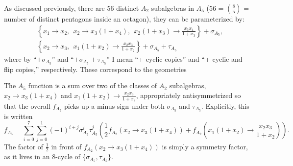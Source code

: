 \documentclass[11pt]{article}
\def\drawOctagon{
\coordinate (P1) at (45:1);
\coordinate (P2) at (90:1);
\coordinate (P3) at (135:1);
\coordinate (P4) at (180:1);
\coordinate (P5) at (225:1);
\coordinate (P6) at (270:1);
\coordinate (P7) at (315:1);
\coordinate (P8) at (359:1);
\draw (P1) -- (P2) -- (P3) -- (P4) -- (P5) -- (P6) -- (P7) -- (P8) -- cycle;
}
\begin{document}
As discussed previously, there are 56 distinct $A_2$ subalgebras in $A_5$ (56 = $\genfrac(){0pt}{1}{8}{5}$ = number of distinct pentagons inside an octagon), they can be parameterized by:
\begin{equation}
\begin{split}
	&\left\{x_1\to x_2,~~
	x_2\to x_3\left(1+x_4\right),~~
	x_2\left(1+x_3\right)\to \frac{x_3 x_4}{1+x_3}\right\} + \sigma_{A_5},\\
	&\left\{x_2\to x_3,~~x_1 \left(1+x_2\right)\to \frac{x_2x_3}{1+x_2}\right\} + \sigma_{A_5} + \tau_{A_5} 
   \end{split}
\end{equation}
where by ``$+\sigma_{A_5}$'' and ``$+\sigma_{A_5}+\tau_{A_5}$'' I mean ``+ cyclic copies'' and ``+ cyclic and flip copies,'' respectively. These correspond to the geometries
\begin{center}
\end{center}

The $A_5$ function is a sum over two of the classes of $A_2$ subalgebras, $x_2\to x_3\left(1+x_4\right)$ and $x_1 \left(1+x_2\right)\to \frac{x_2x_3}{1+x_2}$, appropriately antisymmetrized so that the overall $f_{A_5}$ picks up a minus sign under both $\sigma_{A_5}$ and $\tau_{A_5}$. Explicitly, this is written
\begin{equation}
	f_{A_5} = \sum_{i=0}^7\sum_{j=0}^1(-1)^{i+j}\sigma_{A_5}^i\tau_{A_5}^j\left(\frac12 f_{A_2}\left(x_2\to x_3\left(1+x_4\right)\right) + f_{A_2}\left(x_1 \left(1+x_2\right)\to \frac{x_2x_3}{1+x_2}\right)\right).
\end{equation}
The factor of $\frac12$ in front of $f_{A_2}\left(x_2\to x_3\left(1+x_4\right)\right)$ is simply a symmetry factor, as it lives in an 8-cycle of $\{\sigma_{A_5},\tau_{A_5}\}$.
\end{document}
